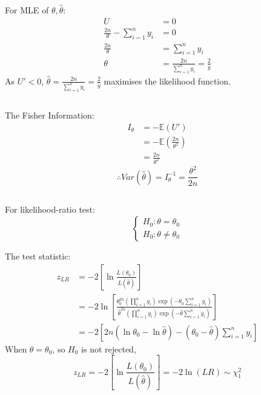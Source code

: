 \documentclass[a4paper]{article}
\begin{document}
		For MLE of \(\theta, \hat{\theta}\):
			\begin{equation*}
				\begin{split}
					U &= 0\\
					\frac{2n}{\theta} - \sum_{i=1}^n y_i &= 0\\
					\frac{2n}{\theta} &= \sum_{i=1}^n y_i\\
					\theta &= \frac{2n}{\sum_{i=1}^n y_i} = \frac{2}{\bar{y}}
				\end{split}
			\end{equation*}
		As \(U' < 0\), \(\hat{\theta} = \frac{2n}{\sum_{i=1}^n y_i} = \frac{2}{\bar{y}}\) maximises the likelihood function.
	
	\newpage
	\subsection{}
		The Fisher Information:
			\begin{equation*}
				\begin{split}
					I_\theta &= -\mathbb{E}(U')\\
					&= -\mathbb{E}\left(\frac{2n}{\theta^2}\right)\\
					&= \frac{2n}{\theta^2}
				\end{split}
			\end{equation*}
			\[\therefore Var(\hat{\theta}) = I_\theta^{-1} = \frac{\theta^2}{2n}\]
	
	\subsection{}
		For likelihood-ratio test:
		\[\begin{cases}
			H_0: \theta = \theta_0\\
			H_0: \theta \neq \theta_0
		\end{cases}\]
		
		The test statistic:
			\begin{equation*}
				\begin{split}
					z_{LR} &= -2\left[\ln\frac{L(\theta_0)}{L(\hat{\theta})}\right]\\
					&= -2 \ln\left[\frac{\theta_0^{2n} \left(\prod_{i=1}^n y_i \right) \exp\left(-\theta_0\sum_{i=1}^ny_i \right)}{\hat{\theta}^{2n} \left(\prod_{i=1}^n y_i \right) \exp\left(-\hat{\theta}\sum_{i=1}^ny_i \right)}\right]\\
					&= -2 \left[2n(\ln\theta_0-\ln\hat{\theta})-(\theta_0-\hat{\theta})\sum_{i=1}^ny_i \right]
				\end{split}
			\end{equation*}
		When \(\theta=\theta_0\), so \(H_0\) is not rejected, 
		\[z_{LR} = -2\left[\ln\frac{L(\theta_0)}{L(\hat{\theta})}\right]=-2\ln(LR)\sim\chi_1^2\]
	
\end{document}
